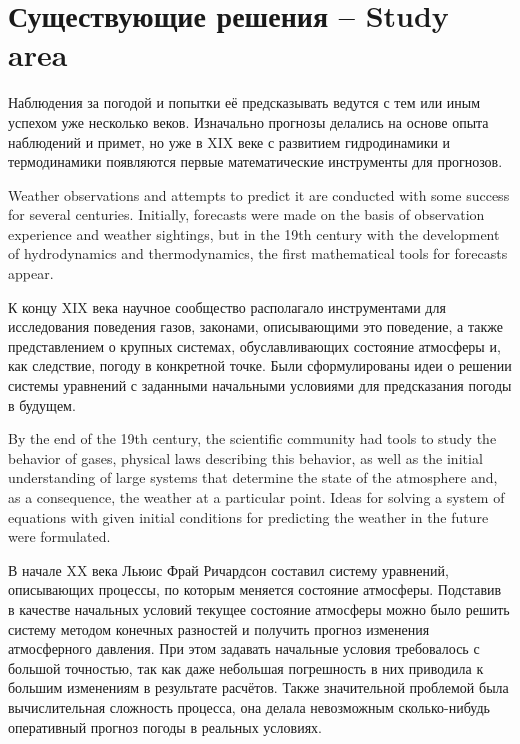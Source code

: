 \documentclass[14pt]{matmex-diploma}
\begin{document}
\section{Существующие решения -- Study area}




Наблюдения за погодой и попытки её предсказывать ведутся с тем или иным успехом уже несколько веков. Изначально прогнозы делались на основе опыта наблюдений и примет, но уже в XIX веке с развитием гидродинамики и термодинамики появляются первые математические инструменты для прогнозов. 

Weather observations and attempts to predict it are conducted with some success for several centuries. Initially, forecasts were made on the basis of observation experience and weather sightings, but in the 19th century with the development of hydrodynamics and thermodynamics, the first mathematical tools for forecasts appear.

К концу XIX века научное сообщество располагало инструментами для исследования поведения газов, законами, описывающими это поведение, а также представлением о крупных системах, обуславливающих состояние атмосферы и, как следствие, погоду в конкретной точке. Были сформулированы идеи о решении системы уравнений с заданными начальными условиями для предсказания погоды в будущем.

By the end of the 19th century, the scientific community had tools to study the behavior of gases, physical laws describing this behavior, as well as the initial understanding of large systems that determine the state of the atmosphere and, as a consequence, the weather at a particular point. Ideas for solving a system of equations with given initial conditions for predicting the weather in the future were formulated.

В начале XX века Льюис Фрай Ричардсон составил систему уравнений, описывающих процессы, по которым меняется состояние атмосферы. Подставив в качестве начальных условий текущее состояние атмосферы можно было решить систему методом конечных разностей и получить прогноз изменения атмосферного давления\cite{lynch2008origins}. При этом задавать начальные условия требовалось с большой точностью, так как даже небольшая погрешность в них приводила к большим изменениям в результате расчётов. Также значительной проблемой была вычислительная сложность процесса, она делала невозможным сколько-нибудь оперативный прогноз погоды в реальных условиях.
\end{document}
